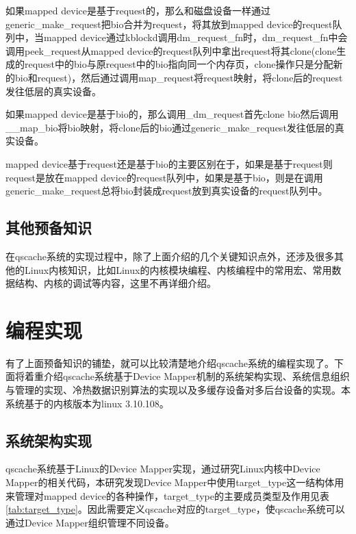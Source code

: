 如果mapped device是基于request的，那么和磁盘设备一样通过generic\_make\_request把bio合并为request，将其放到mapped device的request队列中，当mapped device通过kblockd调用dm\_request\_fn时，dm\_request\_fn中会调用peek\_request从mapped device的request队列中拿出request将其clone(clone生成的request中的bio与原request中的bio指向同一个内存页，clone操作只是分配新的bio和request)，然后通过调用map\_request将request映射，将clone后的request发往低层的真实设备。

如果mapped device是基于bio的，那么调用\_dm\_request首先clone bio然后调用\_\_map\_bio将bio映射，将clone后的bio通过generic\_make\_request发往低层的真实设备。

mapped device基于request还是基于bio的主要区别在于，如果是基于request则request是放在mapped device的request队列中，如果是基于bio，则是在调用generic\_make\_request总将bio封装成request放到真实设备的request队列中。


\subsection{其他预备知识}

在qscache系统的实现过程中，除了上面介绍的几个关键知识点外，还涉及很多其他的Linux内核知识，比如Linux的内核模块编程、内核编程中的常用宏、常用数据结构、内核的调试等内容，这里不再详细介绍。

\section{编程实现}

有了上面预备知识的铺垫，就可以比较清楚地介绍qscache系统的编程实现了。下面将着重介绍qscache系统基于Device Mapper机制的系统架构实现、系统信息组织与管理的实现、冷热数据识别算法的实现以及多缓存设备对多后台设备的实现。本系统基于的内核版本为linux 3.10.108。

\subsection{系统架构实现}

qscache系统基于Linux的Device Mapper实现，通过研究Linux内核中Device Mapper的相关代码，本研究发现Device Mapper中使用target\_type这一结构体用来管理对mapped device的各种操作，target\_type的主要成员类型及作用见表\ref{tab:target_type}。因此需要定义qscache对应的target\_type，使qscache系统可以通过Device Mapper组织管理不同设备。

